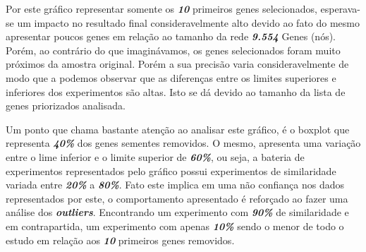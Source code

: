 Por este gráfico representar somente os \textsl{\textbf{10}} primeiros genes selecionados, esperava-se um impacto no resultado final consideravelmente alto devido ao fato do mesmo apresentar poucos genes em relação ao tamanho da rede \textsl{\textbf{9.554}} Genes (nós). Porém, ao contrário do que imaginávamos, os genes selecionados foram muito próximos da amostra original. Porém a sua precisão varia consideravelmente de modo que a podemos observar que as diferenças entre os limites superiores e inferiores dos experimentos são altas. Isto se dá devido ao tamanho da lista de genes priorizados analisada.
%

Um ponto que chama bastante atenção ao analisar este gráfico, é o boxplot que representa \textbf{\textsl{40\%}} dos genes sementes removidos. O mesmo, apresenta uma variação entre o lime inferior e o limite superior de \textbf{\textsl{60\%}}, ou seja, a bateria de experimentos representados pelo gráfico possui experimentos de similaridade variada entre \textbf{\textsl{20\%}} a \textbf{\textsl{80\%}}. Fato este implica em uma não confiança nos dados representados por este, o comportamento apresentado é reforçado ao fazer uma análise dos \textbf{\textsl{outliers}}. Encontrando um experimento com \textbf{\textsl{90\%}} de similaridade e em contrapartida, um experimento com apenas \textbf{\textsl{10\%}} sendo o menor de todo o estudo em relação aos \textbf{\textsl{10}} primeiros genes removidos.

